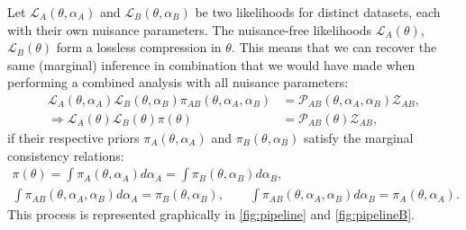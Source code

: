 Let $\mathcal{L}_A(\theta,\alpha_A)$ and $\mathcal{L}_B(\theta,\alpha_B)$ be two likelihoods for distinct datasets, each with their own nuisance parameters. The nuisance-free likelihoods $\mathcal{L}_A(\theta)$, $\mathcal{L}_B(\theta)$ form a lossless compression in $\theta$. This means that we can recover the same (marginal) inference in combination that we would have made when performing a combined analysis with all nuisance parameters:
\begin{align}
    \mathcal{L}_A(\theta,\alpha_A)\mathcal{L}_B(\theta,\alpha_B)\pi_{AB}(\theta,\alpha_A,\alpha_B) &=  \mathcal{P}_{AB}(\theta,\alpha_A,\alpha_B)\mathcal{Z}_{AB},  \label{eqn:combined_bayes}\\
    \Rightarrow
        \mathcal{L}_A(\theta)\mathcal{L}_B(\theta)\pi(\theta) &=  \mathcal{P}_{AB}(\theta)\mathcal{Z}_{AB}, 
        \label{eqn:marginal_combined_bayes}
\end{align}
 if their respective priors $\pi_A(\theta,\alpha_A)$ and $\pi_B(\theta,\alpha_B)$ satisfy the marginal consistency relations:
\begin{gather}
    \pi(\theta) = \int \pi_A(\theta,\alpha_A)d\alpha_A = \int \pi_B(\theta,\alpha_B)d\alpha_B,  
    \label{eqn:marginal_A}\\
    \int \pi_{AB}(\theta,\alpha_A,\alpha_B)d\alpha_A = \pi_B(\theta,\alpha_B), \qquad \int \pi_{AB}(\theta,\alpha_A,\alpha_B)d\alpha_B = \pi_A(\theta,\alpha_A).
    \label{eqn:marginal_B}
\end{gather}
This process is represented graphically in \cref{fig:pipeline} and \cref{fig:pipelineB}.

